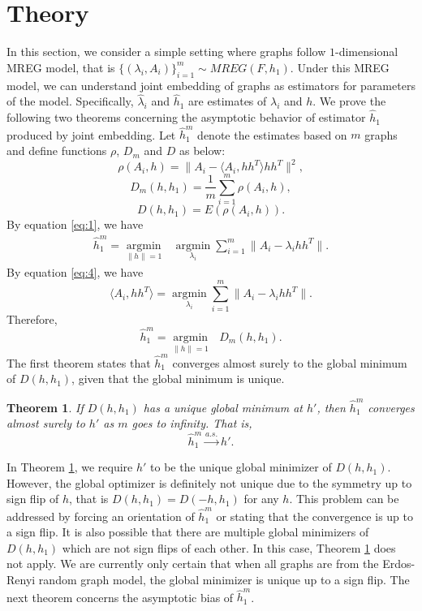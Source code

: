 \documentclass[10pt,journal,compsoc]{IEEEtran}
\newtheorem{theorem}{Theorem}[section]
\begin{document}
\section{Theory}
In this section, we consider a simple setting where graphs follow $1$-dimensional MREG model, that is $\{(\lambda_i,A_i)\} _{i=1}^m \sim MREG(F,h_1)$. Under this MREG model, we can understand joint embedding of graphs as estimators for parameters of the model. Specifically, $\hat{\lambda}_i$ and $\hat{h}_1$ are estimates of $\lambda_i$ and $h$. We prove the following two theorems concerning the asymptotic behavior of estimator $\hat{h}_1$ produced by joint embedding. Let $\hat{h}_1^m$ denote the estimates based on $m$ graphs and define functions $\rho$, $D_m$ and $D$ as below: 
\[ \rho(A_i,h)= \|A_i- \langle A_i,h h^T \rangle h h^T\|^2, \]
\[ D_m(h,h_1) =\frac{1}{m}\sum_{i=1}^{m} \rho(A_i,h), \]
\[ D(h,h_1) = E(\rho(A_i,h)). \]
By equation \eqref{eq:1}, we have
\begin{align*} 
\hat{h}_1^m = \underset{\|h\| =1}{\operatorname{argmin}} \text{ }   \underset{\lambda_i}{\operatorname{argmin}} \sum_{i=1}^{m} \|A_i - \lambda_i h h^T\| .
\end{align*}
By equation \eqref{eq:4}, we have 
\[\langle A_i,hh^T \rangle=\underset{\lambda_i}{\operatorname{argmin}} \sum_{i=1}^{m} \|A_i - \lambda_i h h^T\|.\]
Therefore,
\[\hat{h}_1^m = \underset{\|h\| =1}{\operatorname{argmin}} \text{ } D_m(h,h_1). \]
The first theorem states that $\hat{h}_1^m$  converges almost surely to the global minimum of $D(h,h_1)$, given that the global minimum is unique.
\begin{theorem}
\label{thm:1}
If $D(h,h_1)$ has a unique global minimum at $h'$, then $\hat{h}_1^m$ converges almost surely to $h'$ as $m$ goes to infinity. That is, 
\[ \hat{h}_1^m \overset{a.s.}{\rightarrow} h'. \]
\end{theorem}

\noindent In Theorem \ref{thm:1}, we require $h'$ to be the unique global minimizer of $D(h,h_1)$. However, the global optimizer is definitely not unique due to the symmetry up to sign flip of $h$, that is $D(h,h_1)=D(-h,h_1)$ for any $h$. This problem can be addressed by forcing an orientation of $\hat{h}_1^m$ or stating that the convergence is up to a sign flip. It is also possible that there are multiple global minimizers of $D(h,h_1)$ which are not sign flips of each other. In this case, Theorem \ref{thm:1} does not apply. We are currently only certain that when all graphs are from the Erdos-Renyi random graph model, the global minimizer is unique up to a sign flip. The next theorem concerns the asymptotic bias of $\hat{h}_1^m$. 
\end{document}
